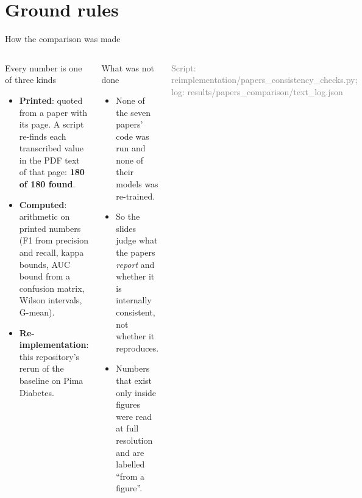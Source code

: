 \documentclass[aspectratio=169,10pt,t,xcolor={table}]{beamer}
\newcommand{\ok}[1]{\textcolor{qgreen}{\textbf{#1}}}
\newcommand{\src}[1]{{\tiny\textcolor{gray}{#1}}}
\begin{document}
\section{Ground rules}
\begin{frame}{How the comparison was made}
\begin{columns}[T]
\begin{block}{Every number is one of three kinds}
\begin{itemize}
  \item \textbf{Printed}: quoted from a paper with its page. A script re-finds each transcribed value in the PDF text of that page: \ok{180 of 180 found}.
  \item \textbf{Computed}: arithmetic on printed numbers (F1 from precision and recall, kappa bounds, AUC bound from a confusion matrix, Wilson intervals, G-mean).
  \item \textbf{Re-implementation}: this repository's rerun of the baseline on Pima Diabetes.
\end{itemize}
\end{block}
\begin{alertblock}{What was not done}
\begin{itemize}
  \item None of the seven papers' code was run and none of their models was re-trained.
  \item So the slides judge what the papers \emph{report} and whether it is internally consistent, not whether it reproduces.
  \item Numbers that exist only inside figures were read at full resolution and are labelled ``from a figure''.
\end{itemize}
\end{alertblock}
\src{Script: reimplementation/papers\_consistency\_checks.py; log: results/papers\_comparison/text\_log.json}
\end{columns}
\end{frame}
\end{document}
